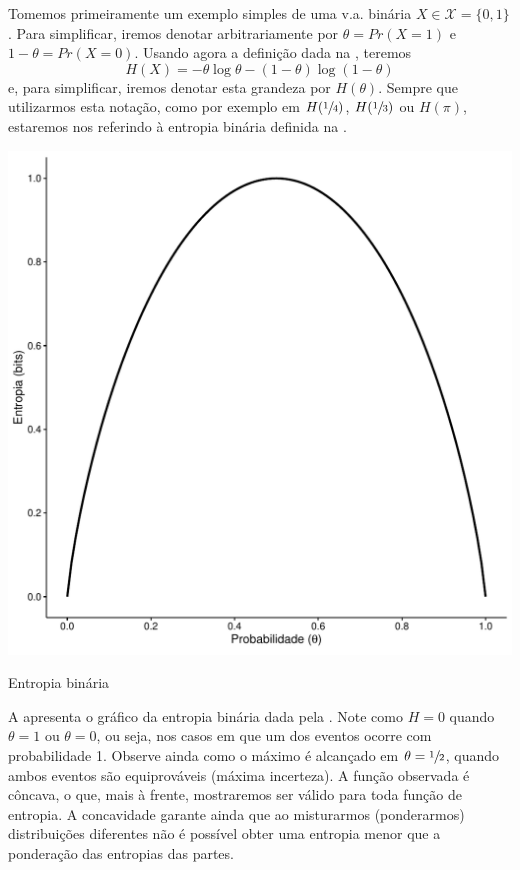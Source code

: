 Tomemos primeiramente um exemplo simples de uma v.a. binária $X \in \mathcal{X} = \{0,1\}$.
Para simplificar, iremos denotar arbitrariamente por $\theta = Pr(X=1)$ e $1-\theta = Pr(X=0)$.
Usando agora a definição dada na , teremos
\begin{equation}\label{eq:entropia-binaria}
H(X) = -\theta \log \theta - (1-\theta) \log (1-\theta)
\end{equation}
e, para simplificar, iremos denotar esta grandeza por $H(\theta)$.
Sempre que utilizarmos esta notação, como por exemplo em $H(\sfrac{1}{4})$, $H(\sfrac{1}{3})$ ou $H(\pi)$,
estaremos nos referindo à entropia binária definida na .

\begin{marginfigure}%
  \includegraphics[width=\linewidth]{plots/binary_entropy.pdf}
  \caption{Entropia binária}
  \label{fig:entropiabinaria}
\end{marginfigure}

A  apresenta o gráfico da entropia binária dada pela
. Note como $H=0$ quando $\theta = 1$ ou $\theta =
0$, ou seja, nos casos em que um dos eventos ocorre com probabilidade 1.
Observe ainda como o máximo é alcançado em $\theta = \sfrac{1}{2}$, quando
ambos eventos são equiprováveis (máxima incerteza). A função observada é
côncava, o que, mais à frente, mostraremos ser válido para toda função de
entropia. A concavidade garante ainda que ao misturarmos (ponderarmos)
distribuições diferentes não é possível obter uma entropia menor que a
ponderação das entropias das partes.

